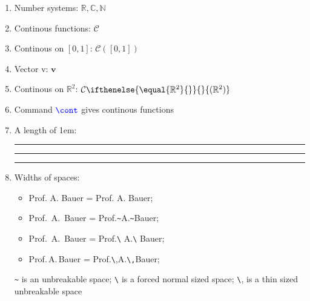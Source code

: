 \documentclass[a4paper]{article}
\newcommand{\numR}{\mathbb{R}}
\newcommand{\numC}{\mathbb{C}}
\newcommand{\numN}{\mathbb{N}}
\newcommand{\cont}{\mathcal{C}}
\newcommand{\continousOn}[1]{\cont(#1)}
\newcommand{\vect}[1]{\mathbf{#1}}
\newcommand{\smartCont}[1][]{
    \cont%
    \ifthenelse{\equal{#1}{}}
        {}
        {(#1)}
}
\newcommand{\cmd}[1]{\textcolor{blue}{\texttt{\textbackslash#1}}}
\newcommand{\demolength}[1]{
    \rule{.1pt}{.5em}%
    \rule{#1}{.1pt}%
    \rule{.1pt}{.5em}
}
\begin{document}
\Large
\begin{enumerate}
    \item Number systems: $\numR, \numC, \numN$
    \item Continous functions: $\cont$
    \item Continous on $[0,1]$: $\continousOn{[0,1]}$
    \item Vector v: $\vect{v}$
    \item Continous on $\numR^2$: $\smartCont[\numR^2]$
    \item Command $\cmd{cont}$ gives continous functions
    \item A length of 1em: \demolength{1em}
    \item Widths of spaces:
    \begin{itemize}
        \item Prof. A. Bauer = Prof. A. Bauer;
        \item Prof.~A.~Bauer = Prof.\texttt{\textasciitilde}A.\texttt{\textasciitilde}Bauer;
        \item Prof.\ A.\ Bauer = Prof.\texttt{\textbackslash} A.\texttt{\textbackslash} Bauer;
        \item Prof.\,A.\,Bauer = Prof.\texttt{\textbackslash},A.\texttt{\textbackslash,}Bauer;
    \end{itemize}
    \texttt{\textasciitilde} is an unbreakable space;
    \texttt{\textbackslash}  is a forced normal sized space;
    \texttt{\textbackslash}, is a thin sized unbreakable space
\end{enumerate}
\end{document}
